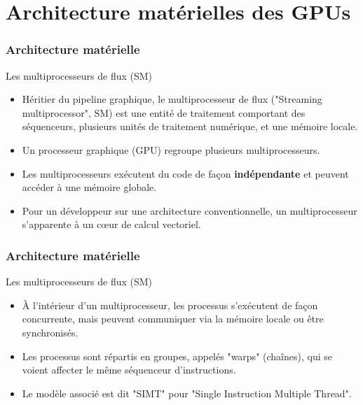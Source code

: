\section{Architecture matérielles des GPUs}
\begin{frame}
    \frametitle{Architecture matérielle}
\begin{block}{Les multiprocesseurs de flux (SM)}
   \begin{itemize}
    \item<+-> Héritier du pipeline graphique, le multiprocesseur de flux ("Streaming multiprocessor", SM) 
    est une entité de traitement comportant des séquenceurs, plusieurs unités de traitement numérique, et une mémoire locale.
    \item<+-> Un processeur graphique (GPU) regroupe plusieurs multiprocesseurs. 
    \item<+-> Les multiprocesseurs exécutent du code de façon \textbf{indépendante} et peuvent accéder à
    une mémoire globale.
    \item<+-> Pour un développeur sur une architecture conventionnelle, un multiprocesseur s'apparente à un c{\oe}ur de calcul
    vectoriel.
   \end{itemize}
\end{block}
    

\end{frame}
\begin{frame}
    \frametitle{Architecture matérielle}
\begin{block}{Les multiprocesseurs de flux (SM)}
   \begin{itemize}
    \item<+->À l'intérieur d'un multiprocesseur, les processus s'exécutent de façon concurrente, mais peuvent communiquer
    via la mémoire locale ou être synchronisés.
    \item<+->Les processus sont répartis en groupes, appelés "warps" (chaînes), qui se voient affecter le même séquenceur 
    d'instructions.
    \item<+->Le modèle associé est dit "SIMT" pour "Single Instruction Multiple Thread".
   \end{itemize} 
\end{block}
\end{frame}
